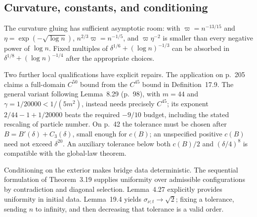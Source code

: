 \documentclass[10pt]{article}
\begin{document}
\subsection*{Curvature, constants, and conditioning}
The curvature gluing has sufficient asymptotic room: with \(\varpi=n^{-13/15}\) and \(\eta=\exp(-\sqrt{\log n})\), \(n^{2/3}\varpi=n^{-1/5}\), and \(\varpi\eta^{-2}\) is smaller than every negative power of \(\log n\). Fixed multiples of \(\delta^{1/6}+(\log n)^{-1/3}\) can be absorbed in \(\delta^{1/8}+(\log n)^{-1/4}\) after the appropriate choices.\par
Two further local qualifications have explicit repairs. The application on p. 205 claims a full-domain \(C^{50}\) bound from the \(C^{45}\) bound in Definition 17.9. The general variant following Lemma 8.29 (p. 98), with \(m=44\) and \(\gamma=1/20000<1/(5m^2)\), instead needs precisely \(C^{45}\); its exponent \(2/44-1+1/20000\) beats the required \(-9/10\) budget, including the stated rescaling of particle number. On p. 42 the tolerance must be chosen after \(B=B'(\delta)+C_3(\delta)\), small enough for \(c(B)\); an unspecified positive \(c(B)\) need not exceed \(\delta^{20}\). An auxiliary tolerance below both \(c(B)/2\) and \((\delta/4)^8\) is compatible with the global-law theorem.\par
Conditioning on the exterior makes bridge data deterministic. The sequential formulation of Theorem 3.19 supplies uniformity over admissible configurations by contradiction and diagonal selection. Lemma 4.27 explicitly provides uniformity in initial data. Lemma 19.4 yields \(\sigma_{\nu;t}\to\sqrt2\); fixing a tolerance, sending \(n\) to infinity, and then decreasing that tolerance is a valid order.\par
\end{document}
